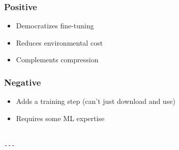 \subsubsection{Positive}
\begin{itemize}
\item Democratizes fine-tuning
\item Reduces environmental cost
\item Complements compression

\end{itemize}
\subsubsection{Negative}
\begin{itemize}
\item Adds a training step (can't just download and use)
\item Requires some ML expertise
\end{itemize}
\begin{lstlisting}

---
\end{lstlisting}